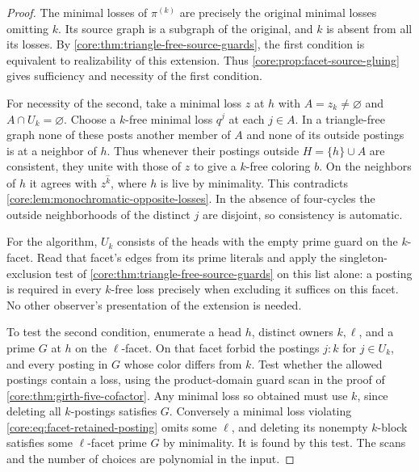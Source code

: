 \begin{proof}
The minimal losses of $\pi^{(k)}$ are precisely the original minimal
losses omitting $k$. Its source graph is a subgraph of the original,
and $k$ is absent from all its losses. By
\cref{core:thm:triangle-free-source-guards}, the first condition is
equivalent to realizability of this extension. Thus
\cref{core:prop:facet-source-gluing} gives sufficiency and necessity
of the first condition.

For necessity of the second, take a minimal loss $z$ at $h$ with
$A=z_k\ne\varnothing$ and $A\cap U_k=\varnothing$. Choose a $k$-free
minimal loss $q^j$ at each $j\in A$. In a triangle-free graph none
of these posts another member of $A$ and none of its outside postings
is at a neighbor of $h$. Thus whenever their postings outside
$H=\{h\}\cup A$ are consistent, they unite with those of $z$ to
give a $k$-free coloring $b$. On the neighbors of $h$ it agrees
with $z^{\widehat k}$, where $h$ is live by minimality. This
contradicts \cref{core:lem:monochromatic-opposite-losses}.
In the absence of four-cycles the outside neighborhoods of the
distinct $j$ are disjoint, so consistency is automatic.

For the algorithm, $U_k$ consists of the heads with the empty prime
guard on the $k$-facet. Read that facet's edges from its prime literals
and apply the singleton-exclusion test of
\cref{core:thm:triangle-free-source-guards} on this list alone: a
posting is required in every $k$-free loss precisely when excluding
it suffices on this facet. No other observer's presentation of the
extension is needed.

To test the second condition, enumerate a head $h$, distinct owners
$k,\ell$, and a prime $G$ at $h$ on the $\ell$-facet. On that facet
forbid the postings $j:k$ for $j\in U_k$, and every posting in $G$
whose color differs from $k$. Test whether the allowed postings
contain a loss, using the product-domain guard scan in the proof of
\cref{core:thm:girth-five-cofactor}. Any minimal loss so obtained
must use $k$, since deleting all $k$-postings satisfies $G$.
Conversely a minimal loss violating \eqref{core:eq:facet-retained-posting}
omits some $\ell$, and deleting its nonempty $k$-block satisfies
some $\ell$-facet prime $G$ by minimality. It is found by this test.
The scans and the number of choices are polynomial in the input.


\end{proof}
